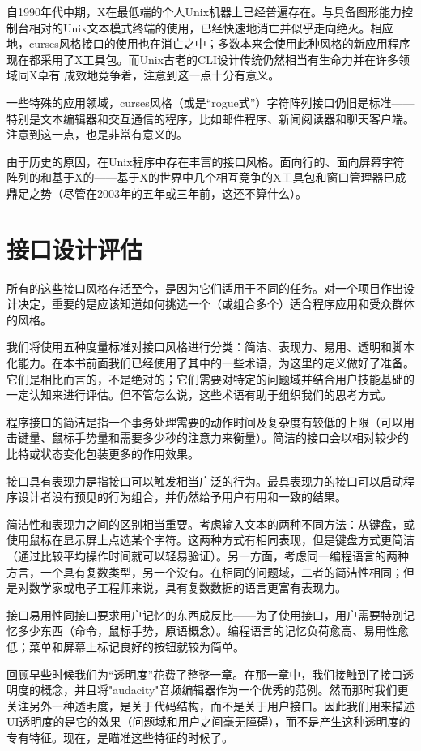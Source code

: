 \documentclass[12pt,oneside]{book}
\begin{document}
自1990年代中期，X在最低端的个人Unix机器上已经普遍存在。与具备图形能力控制台相对的Unix文本模式终端的使用，已经快速地消亡并似乎走向绝灭。相应地，curses风格接口的使用也在消亡之中；多数本来会使用此种风格的新应用程序现在都采用了X工具包。而Unix古老的CLI设计传统仍然相当有生命力并在许多领域同X卓有
成效地竞争着，注意到这一点十分有意义。

一些特殊的应用领域，curses风格（或是“rogue式”）字符阵列接口仍旧是标准——特别是文本编辑器和交互通信的程序，比如邮件程序、新闻阅读器和聊天客户端。注意到这一点，也是非常有意义的。

由于历史的原因，在Unix程序中存在丰富的接口风格。面向行的、面向屏幕字符阵列的和基于X的——基于X的世界中几个相互竞争的X工具包和窗口管理器已成鼎足之势（尽管在2003年的五年或三年前，这还不算什么）。

\section{接口设计评估}
所有的这些接口风格存活至今，是因为它们适用于不同的任务。对一个项目作出设计决定，重要的是应该知道如何挑选一个（或组合多个）适合程序应用和受众群体的风格。

我们将使用五种度量标准对接口风格进行分类：简洁、表现力、易用、透明和脚本化能力。在本书前面我们已经使用了其中的一些术语，为这里的定义做好了准备。它们是相比而言的，不是绝对的；它们需要对特定的问题域并结合用户技能基础的一定认知来进行评估。但不管怎么说，这些术语有助于组织我们的思考方式。

程序接口的简洁是指一个事务处理需要的动作时间及复杂度有较低的上限（可以用击键量、鼠标手势量和需要多少秒的注意力来衡量）。简洁的接口会以相对较少的比特或状态变化包装更多的作用效果。

接口具有表现力是指接口可以触发相当广泛的行为。最具表现力的接口可以启动程序设计者没有预见的行为组合，并仍然给予用户有用和一致的结果。

简洁性和表现力之间的区别相当重要。考虑输入文本的两种不同方法：从键盘，或使用鼠标在显示屏上点选某个字符。这两种方式有相同表现，但是键盘方式更简洁（通过比较平均操作时间就可以轻易验证）。另一方面，考虑同一编程语言的两种方言，一个具有复数类型，另一个没有。在相同的问题域，二者的简洁性相同；但是对数学家或电子工程师来说，具有复数数据的语言更富有表现力。

接口易用性同接口要求用户记忆的东西成反比——为了使用接口，用户需要特别记忆多少东西（命令，鼠标手势，原语概念）。编程语言的记忆负荷愈高、易用性愈低；菜单和屏幕上标记良好的按钮就较为简单。

回顾早些时候我们为“透明度”花费了整整一章。在那一章中，我们接触到了接口透明度的概念，并且将"audacity"音频编辑器作为一个优秀的范例。然而那时我们更关注另外一种透明度，是关于代码结构，而不是关于用户接口。因此我们用来描述UI透明度的是它的效果（问题域和用户之间毫无障碍），而不是产生这种透明度的专有特征。现在，是瞄准这些特征的时候了。
\end{document}
